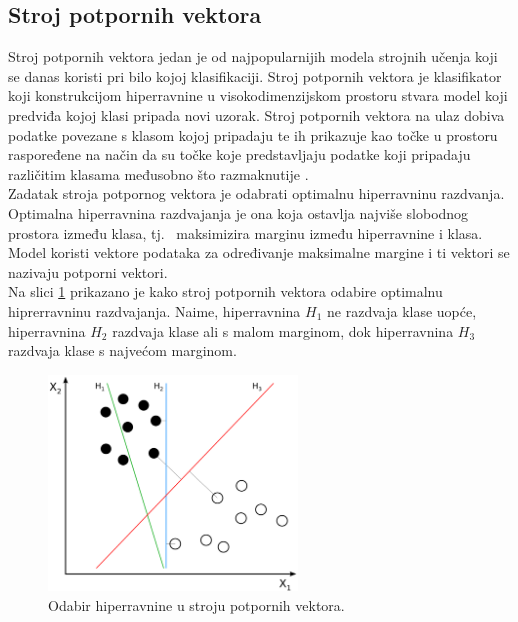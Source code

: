 \documentclass[times,utf8,zavrsni]{fer}
\begin{document}

\clearpage


\subsection{Stroj potpornih vektora}
Stroj potpornih vektora jedan je od najpopularnijih modela strojnih učenja koji se danas koristi pri bilo kojoj klasifikaciji. Stroj potpornih vektora je klasifikator koji konstrukcijom hiperravnine u visokodimenzijskom prostoru stvara model koji predviđa kojoj klasi pripada novi uzorak. Stroj potpornih vektora na ulaz dobiva podatke povezane s klasom kojoj pripadaju te ih prikazuje kao točke u prostoru raspoređene na način da su točke koje predstavljaju podatke koji pripadaju različitim klasama međusobno što razmaknutije \citep{learnsvm}. \\

Zadatak stroja potpornog vektora je odabrati optimalnu hiperravninu razdvanja. Optimalna hiperravnina razdvajanja je ona koja ostavlja najviše slobodnog prostora između klasa, tj.~ maksimizira marginu između hiperravnine i klasa. Model koristi vektore podataka za određivanje maksimalne margine i ti vektori se nazivaju potporni vektori. \\

Na slici \ref{fig:logistic} prikazano je kako stroj potpornih vektora odabire optimalnu hiprerravninu razdvajanja. Naime, hiperravnina $H_{1}$ ne razdvaja klase uopće, hiperravnina $H_{2}$ razdvaja klase ali s malom marginom, dok hiperravnina $H_{3}$ razdvaja klase s najvećom marginom. \\

\begin{figure}[]
	\centering
	\includegraphics[width=250px]{img/svm.png}
	\caption{Odabir hiperravnine u stroju potpornih vektora.\protect\footnotemark }
	\label{fig:logistic}
\end{figure}
\end{document}
